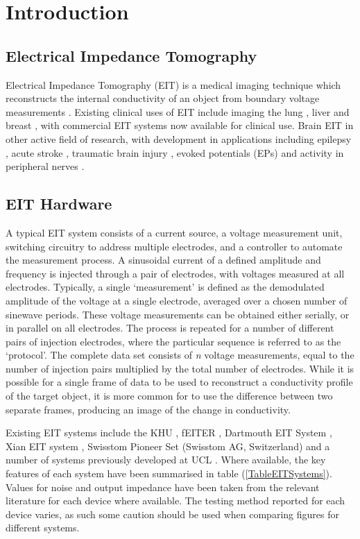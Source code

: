 \section{Introduction}

\subsection{Electrical Impedance Tomography}
Electrical Impedance Tomography (EIT) is a medical imaging technique which reconstructs the internal conductivity of an object from boundary voltage measurements \cite{Metherall1996}. Existing clinical uses of EIT include imaging the lung \cite{Frerichs_2000}, liver \cite{YOU_2009} and breast \cite{Halter}, with commercial EIT systems now available for clinical use. Brain EIT in other active field of research, with development in applications including epilepsy \cite{Vongerichten_2016,Fabrizi_2006}, acute stroke \cite{Dowrick_2016}, traumatic brain injury \cite{Manwaring2013,fu2014use}, evoked potentials (EPs) \cite{Aristovich_2016} and activity in peripheral nerves \cite{KirillStockholm}. 
\subsection{EIT Hardware}

A typical EIT system consists of a current source, a voltage measurement unit, switching circuitry to address multiple electrodes, and a controller to automate the measurement process. A sinusoidal current of a defined amplitude and frequency is injected through a pair of electrodes, with voltages measured at all electrodes. Typically, a single `measurement' is defined as the demodulated amplitude of the voltage at a single electrode, averaged over a chosen number of sinewave periods. These voltage measurements can be obtained either serially, or in parallel on all electrodes. The process is repeated for a number of different pairs of injection electrodes, where the particular sequence is referred to as the `protocol'. The complete data set consists of \emph{n} voltage measurements, equal to the number of injection pairs multiplied by the total number of electrodes. While it is possible for a single frame of data to be used to reconstruct a conductivity profile of the target object, it is more common for to use the difference between two separate frames, producing an image of the change in conductivity.

Existing EIT systems include the KHU \cite{Hun_Wi_2014}, fEITER \cite{McCann_2011}, Dartmouth EIT System \cite{khan}, Xian EIT system \cite{Shi_Xuetao_2005}, Swisstom Pioneer Set (Swisstom AG, Switzerland) and a number of systems previously developed at UCL \cite{Oh2011} \cite{McEwan_2006}. Where available, the key features of each system have been summarised in table (\ref{TableEITSystems}). Values for noise and output impedance have been taken from the relevant literature for each device where available. The testing method reported for each device varies, as such some caution should be used when comparing figures for different systems.
